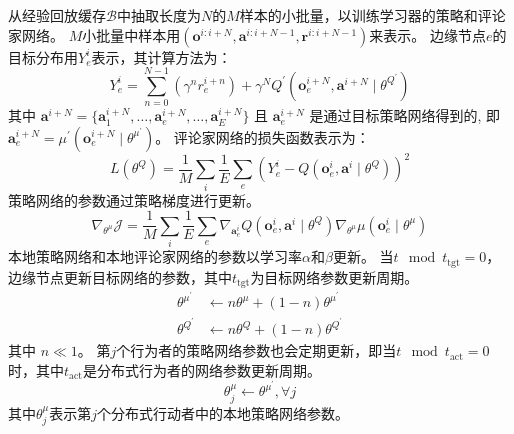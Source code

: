 从经验回放缓存$\mathcal{B}$中抽取长度为$N$的$M$样本的小批量，以训练学习器的策略和评论家网络。
$M$小批量中样本用$\left(\boldsymbol{o}^{i:i+N}, \boldsymbol{a}^{i:i+N-1}, \boldsymbol{r}^{i:i+N-1}\right)$来表示。
边缘节点$e$的目标分布用$Y_e^i$表示，其计算方法为：
\begin{equation}
	Y_e^{i} = \sum_{n=0}^{N-1} \left( \gamma^{n} r_{e}^{i+n}\right)+\gamma^{N} Q^{\prime}\left(\boldsymbol{o}_{e}^{i+N}, \boldsymbol{a}^{i+N} \mid \theta^{Q^{\prime}} \right)
\end{equation}
\noindent 其中 $\boldsymbol{a}^{i+N} = \{ \boldsymbol{a}_{1}^{i+N}, \ldots, \boldsymbol{a}_{e}^{i+N}, \ldots, \boldsymbol{a}_{E}^{i+N} \}$ 且 $\boldsymbol{a}_{e}^{i+N}$ 是通过目标策略网络得到的, 即$\boldsymbol{a}_{e}^{i+N} = \mu^{\prime}(\boldsymbol{o}_{e}^{i+N} \mid \theta^{\mu^{\prime}})$。
评论家网络的损失函数表示为：
\begin{equation}
	{L}\left(\theta^{Q}\right)=\frac{1}{M} \sum_{i} \frac{1}{E} \sum_{e} \left(Y_e^{i}-Q\left(\boldsymbol{o}_{e}^{i}, \boldsymbol{a}^{i} \mid \theta^{Q}\right)\right)^{2}
\end{equation}
策略网络的参数通过策略梯度进行更新。
\begin{equation}
	\nabla_{\theta^{\mu}} \mathcal{J} = \frac{1}{M} \sum_{i} \frac{1}{E} \sum_{e} \nabla_{\boldsymbol{a}_{e}^{i}} Q\left(\boldsymbol{o}_{e}^{i}, \boldsymbol{a}^{i} \mid \theta^{Q}\right) \nabla_{\theta^{\mu}} \mu\left(\boldsymbol{o}_{e}^{i} \mid \theta^{\mu}\right)
\end{equation}
本地策略网络和本地评论家网络的参数以学习率$\alpha$和$\beta$更新。
当$t\mod t_{\operatorname{tgt}}=0$，边缘节点更新目标网络的参数，其中$t_{\operatorname{tgt}}$为目标网络参数更新周期。
\begin{align}
	\theta^{\mu^{\prime}} &\leftarrow n \theta^{\mu}+(1-n)  \theta^{\mu^{\prime}}\\
	\theta^{Q^{\prime}} &\leftarrow n  \theta^{Q}+(1-n) \theta^{Q^{\prime}}
\end{align}
\noindent 其中 $n \ll 1$。
第$j$个行为者的策略网络参数也会定期更新，即当$t \mod t_{\operatorname{act}} = 0$时，其中$t_{\operatorname{act}}$是分布式行为者的网络参数更新周期。
\begin{equation}
	\theta_{j}^{\mu} \leftarrow \theta^{\mu^{\prime}}, \forall j
\end{equation}
其中$\theta_{j}^{\mu}$表示第$j$个分布式行动者中的本地策略网络参数。
	
